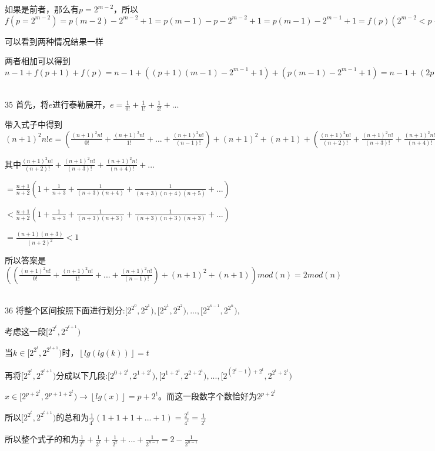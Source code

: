 \documentclass[onecolumn]{article}
\begin{document}
如果是前者，那么有$p=2^{m-2}$，所以$f(p=2^{m-2})=p(m-2)-2^{m-2}+1=p(m-1)-p-2^{m-2}+1=p(m-1)-2^{m-1}+1=f(p)(2^{m-2}<p<2^{m-1})$ \par
可以看到两种情况结果一样 \par
两者相加可以得到$n-1+f(p+1)+f(p)=n-1+\left ((p+1)(m-1)-2^{m-1}+1  \right )+\left (p(m-1)-2^{m-1}+1  \right )=n-1+(2p+1)(m-1)-2^{m}+2=nm-2^{m}+1=f(n)$ \par
~\\
35 首先，将$e$进行泰勒展开，$e=\frac{1}{0!}+\frac{1}{1!}+\frac{1}{2!}+...$ \par
带入式子中得到$(n+1)^{2}n!e=\left ( \frac{(n+1)^{2}n!}{0!}+\frac{(n+1)^{2}n!}{1!}+ ...+\frac{(n+1)^{2}n!}{(n-1)!}\right )+(n+1)^{2}+(n+1)+\left ( \frac{(n+1)^{2}n!}{(n+2)!}+\frac{(n+1)^{2}n!}{(n+3)!}+\frac{(n+1)^{2}n!}{(n+4)!}+... \right )$ \par
其中$ \frac{(n+1)^{2}n!}{(n+2)!}+\frac{(n+1)^{2}n!}{(n+3)!}+\frac{(n+1)^{2}n!}{(n+4)!}+...$ \par
$=\frac{n+1}{n+2}\left ( 1+\frac{1}{n+3}+\frac{1}{(n+3)(n+4)} +\frac{1}{(n+3)(n+4)(n+5)}+...\right )$ \par
$<\frac{n+1}{n+2}\left ( 1+\frac{1}{n+3}+\frac{1}{(n+3)(n+3)} +\frac{1}{(n+3)(n+3)(n+3)}+...\right )$ \par
$=\frac{(n+1)(n+3)}{(n+2)^{2}}<1$ \par
所以答案是$\left (\left ( \frac{(n+1)^{2}n!}{0!}+\frac{(n+1)^{2}n!}{1!}+ ...+\frac{(n+1)^{2}n!}{(n-1)!}\right )+(n+1)^{2}+(n+1)  \right )mod\left ( n \right )=2mod\left ( n \right )$\par
~\\
36 将整个区间按照下面进行划分:$[2^{2^{0}},2^{2^{1}}),[2^{2^{1}},2^{2^{2}}),...,[2^{2^{n-1}},2^{2^{n}}),$ \par
考虑这一段$[2^{2^{t}},2^{2^{t+1}})$\par
当$k\in [2^{2^{t}},2^{2^{t+1}})$时，$\left \lfloor lg(lg(k)) \right \rfloor=t$ \par
再将$[2^{2^{t}},2^{2^{t+1}})$分成以下几段:$[2^{0+2^{t}},2^{1+2^{t}}),[2^{1+2^{t}},2^{2+2^{t}}),...,[2^{(2^{t}-1)+2^{t}},2^{2^{t}+2^{t}})$\par
$x\in [2^{p+2^{t}},2^{p+1+2^{t}})\rightarrow \left \lfloor lg(x) \right \rfloor=p+2^{t}$。而这一段数字个数恰好为$2^{p+2^{t}}$ \par
所以$[2^{2^{t}},2^{2^{t+1}})$的总和为$\frac{1}{4^{t}}(1+1+1+...+1)=\frac{2^{t}}{4^{t}}=\frac{1}{2^{t}}$ \par
所以整个式子的和为$\frac{1}{2^{0}}+\frac{1}{2^{1}}+\frac{1}{2^{2}}+...+\frac{1}{2^{n-1}}=2-\frac{1}{2^{n-1}}$\par
\end{document}
